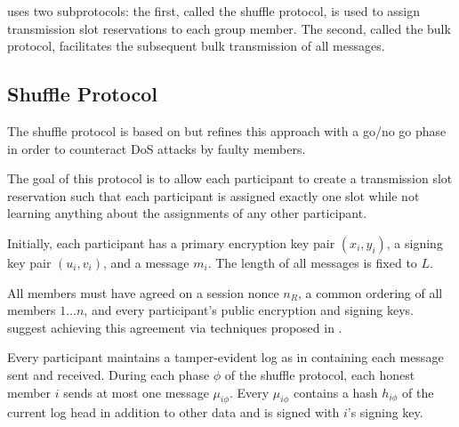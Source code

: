 \Dissent uses two subprotocols: the first, called the shuffle protocol, is used to assign
transmission slot reservations to each group member. The second, called the bulk protocol,
facilitates the subsequent bulk transmission of all messages.


\begin{comment}
\subsection{Notation}

Public/private key pairs are referred to as $(x_i, y_i)$, where $x_i$ denotes the private
key while $y_i$ denotes the public key.
\end{comment}

\subsection{Shuffle Protocol}

The shuffle protocol is based on \cite{brickell2006efficient} but refines this approach
with a go/no go phase in order to counteract \ac{DoS} attacks by faulty members.

The goal of this protocol is to allow each participant to create a transmission slot reservation
such that each participant is assigned exactly one slot while not learning anything about
the assignments of any other participant.

Initially, each participant has a primary encryption key pair $(x_i, y_i)$, a signing key pair
$(u_i, v_i)$, and a message $m_i$. The length of all messages is fixed to $L$.


All members must have agreed on a session nonce $n_R$, a common ordering of all members
$1 \ldots n$, and every participant's public encryption and signing keys. \citeauthor{journals/corr/abs-1004-3057} suggest achieving this agreement via techniques
proposed in \cite{lamport1998part,castro1999practical}.

Every participant maintains a tamper-evident log as in \cite{haeberlen2007peerreview}
containing each message sent and received. During each phase $\phi$ of the shuffle protocol,
each honest member $i$ sends at most one message $\mu_{i\phi}$.
Every $\mu_{i\phi}$ contains a hash $h_{i\phi}$ of the current log head in addition to other data
and is signed with $i$'s signing key.

